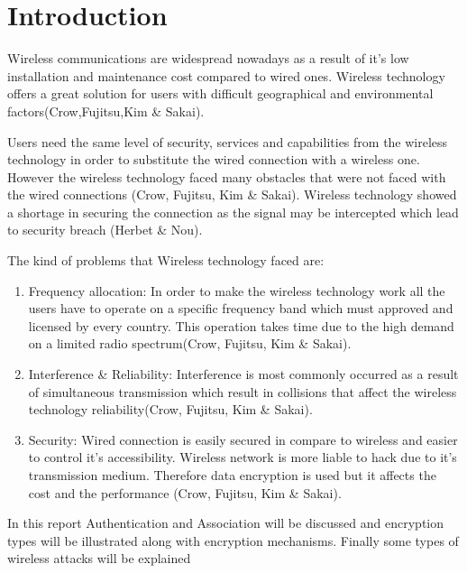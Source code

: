 \chapter{Introduction}
\label{chap:intro}

Wireless communications are widespread nowadays as a result of it's low installation and maintenance cost compared to wired ones. Wireless technology offers a great solution for users with difficult geographical and environmental factors(Crow,Fujitsu,Kim \& Sakai).

Users need the same level of security, services and capabilities from the wireless technology in order to substitute the wired connection with a wireless one. However the wireless technology faced many obstacles that were not faced with the wired connections (Crow, Fujitsu, Kim \& Sakai). Wireless technology showed a shortage in securing the connection as the signal may be intercepted which lead to security breach (Herbet \& Nou).

The kind of problems that Wireless technology faced are:

\begin{enumerate}
  \item Frequency allocation: In order to make the wireless technology work all the users have to operate on a specific frequency band which must approved and licensed by every country. This operation takes time due to the high demand on a limited radio spectrum(Crow, Fujitsu, Kim \& Sakai).
  \item Interference \& Reliability: Interference is most commonly occurred as a result of simultaneous transmission which result in collisions that affect the wireless technology reliability(Crow, Fujitsu, Kim \& Sakai).
  \item Security: Wired connection is easily secured in compare to wireless and easier to control it's accessibility. Wireless network is more liable to hack due to it's transmission medium. Therefore data encryption is used but it affects the cost and the performance (Crow, Fujitsu, Kim \& Sakai).
\end{enumerate}


In this report Authentication and Association will be discussed and encryption types will be illustrated along with encryption mechanisms. Finally some types of wireless attacks will be explained
